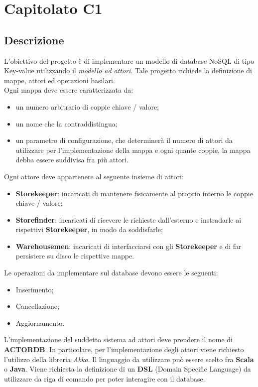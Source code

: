 \newpage
\section{Capitolato C1}
\subsection{Descrizione}
L'obiettivo del progetto è di implementare un modello di database NoSQL di tipo Key-value utilizzando il \textit{modello ad attori}.
Tale progetto richiede la definizione di mappe, attori ed operazioni basilari. 
\\Ogni mappa deve essere caratterizzata da:
\begin{itemize}
\item un numero arbitrario di coppie chiave / valore;
\item un nome che la contraddistingua; 
\item un parametro di configurazione, che determinerà il numero di attori da utilizzare per l'implementazione della mappa e ogni quante coppie, la mappa debba essere suddivisa fra più attori.
\end{itemize}
Ogni attore deve appartenere al seguente insieme di attori:
\begin{itemize}
\item \textbf{Storekeeper}: incaricati di mantenere fisicamente al proprio interno le coppie chiave / valore;
\item \textbf{Storefinder}: incaricati di ricevere le richieste dall’esterno e instradarle ai 
rispettivi \textbf{Storekeeper}, in modo da soddisfarle; 
\item \textbf{Warehousemen}: incaricati di interfacciarsi con gli \textbf{Storekeeper} e di far persistere su disco le rispettive mappe.
\end{itemize}

Le operazioni da implementare sul database devono essere le seguenti: 
\begin{itemize}
\item Inserimento;
\item Cancellazione;
\item Aggiornamento. 
\end{itemize}

L'implementazione del suddetto sistema ad attori deve prendere il nome di \textbf{ACTORDB}. In particolare, per l'implementazione degli attori viene richiesto l'utilizzo della libreria \textit{Akka}.
Il linguaggio da utilizzare può essere scelto fra \textbf{Scala} o \textbf{Java}. 
Viene richiesta la definizione di un \textbf{DSL} (Domain Specific Language) da utilizzare da riga di comando per poter interagire con il database.

